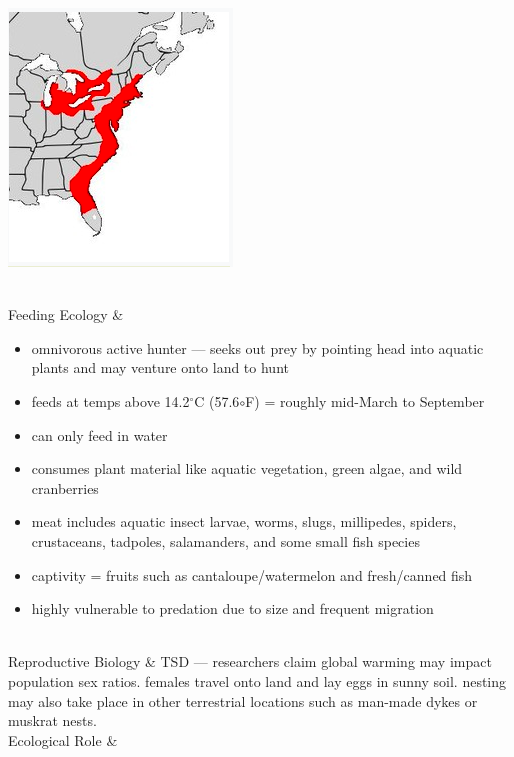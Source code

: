 \begin{center}
\begin{longtabu}
	\begin{center} \includegraphics[scale=0.5]{testudines/emydidae/clemmys/range} \end{center}
	\\
	\hline
	Feeding Ecology & 
	\begin{itemize}[noitemsep]
		\item omnivorous active hunter --- seeks out prey by pointing head into aquatic plants and may venture onto land to hunt
		\item feeds at temps above 14.2$^\circ$C (57.6$\circ$F) = roughly mid-March to September
		\item can only feed in water
		\item consumes plant material like aquatic vegetation, green algae, and wild cranberries
		\item meat includes aquatic insect larvae, worms, slugs, millipedes, spiders, crustaceans, tadpoles, salamanders, and some small fish species
		\item captivity = fruits such as cantaloupe/watermelon and fresh/canned fish
		\item highly vulnerable to predation due to size and frequent migration
	\end{itemize}
	\\
	\hline
	Reproductive Biology & 
	TSD --- researchers claim global warming may impact population sex ratios. females travel onto land and lay eggs in sunny soil. nesting may also take place in other terrestrial locations such as man-made dykes or muskrat nests.
	\\
	\hline
	Ecological Role &
	

\end{longtabu}
\end{center}
